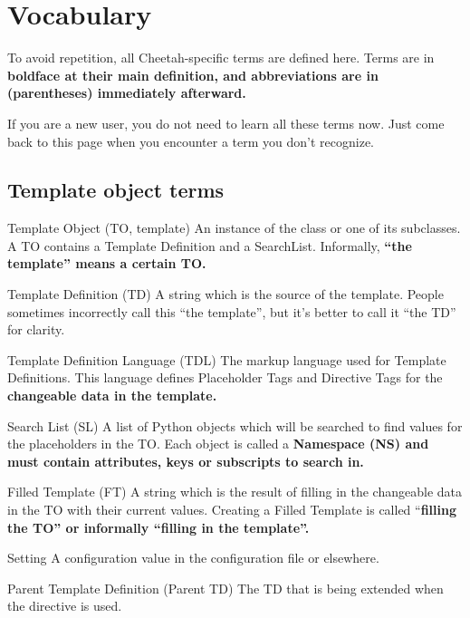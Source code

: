 \section{Vocabulary}
\label{vocabulary}

To avoid repetition, all Cheetah-specific terms are defined here.  Terms are in
\bf{boldface} at their main definition, and abbreviations are in (parentheses)
immediately afterward.  

If you are a new user, you do not need to learn all these terms now.
Just come back to this page when you encounter a term you don't recognize.

\subsection{Template object terms}

\begin{description}

\item{Template Object (TO, template)}  An instance of the class
      or one of its subclasses.  A 
     TO contains a Template Definition and a SearchList.  Informally, 
     \bf{``the template''} means a certain TO.

\item{Template Definition (TD)}  A string which is the source of the template.
     People sometimes incorrectly call this ``the template'', but it's better
     to call it ``the TD'' for clarity.

\item{Template Definition Language (TDL)}  The markup language used for
     Template Definitions.  This language defines Placeholder Tags and
     Directive Tags for the \bf{changeable data} in the template.

\item{Search List (SL)}  A list of Python objects which will be searched to find
     values for the placeholders in the TO.  Each object is called a
     \bf{Namespace (NS)} and must contain attributes, keys or subscripts to
     search in.  

\item{Filled Template (FT)}  A string which is the result of filling in the
     changeable data in the TO with their current values.
     Creating a Filled Template is called ``\bf{filling} the TO'' or 
     informally ``filling in the template''.

\item{Setting}  A configuration value in the configuration file or elsewhere.

\item{Parent Template Definition (Parent TD)}  The TD that is being extended
     when the  directive is used.

\end{description}

